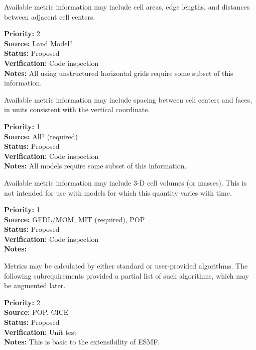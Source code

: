 Available metric information may include cell areas, edge lengths, and distances between
adjacent cell centers.
\begin{reqlist}
{\bf Priority:} 2 \\
{\bf Source:} Land Model? \\
{\bf Status:} Proposed \\
{\bf Verification:} Code inspection \\
{\bf Notes:} All using unstructured horizontal grids require some subset of this
information.
\end{reqlist}

Available metric information may include spacing between cell centers and faces, in
units consistent with the vertical coordinate.
\begin{reqlist}
{\bf Priority:} 1 \\
{\bf Source:} All? (required) \\
{\bf Status:} Proposed \\
{\bf Verification:} Code inspection \\
{\bf Notes:} All models require some subset of this information.
\end{reqlist}

Available metric information may include 3-D cell volumes (or masses).  This is not
intended for use with models for which this quantity varies with time.
\begin{reqlist}
{\bf Priority:} 1 \\
{\bf Source:} GFDL/MOM, MIT (required), POP \\
{\bf Status:} Proposed \\
{\bf Verification:} Code inspection \\
{\bf Notes:} 
\end{reqlist}

Metrics may be calculated by either standard or user-provided algorithms.
The following subrequirements provided a partial list of such algorithms,
which may be augmented later.
\begin{reqlist}
{\bf Priority:} 2 \\
{\bf Source:} POP, CICE \\
{\bf Status:} Proposed \\
{\bf Verification:} Unit test \\
{\bf Notes:} This is basic to the extensibility of ESMF. 
\end{reqlist}


